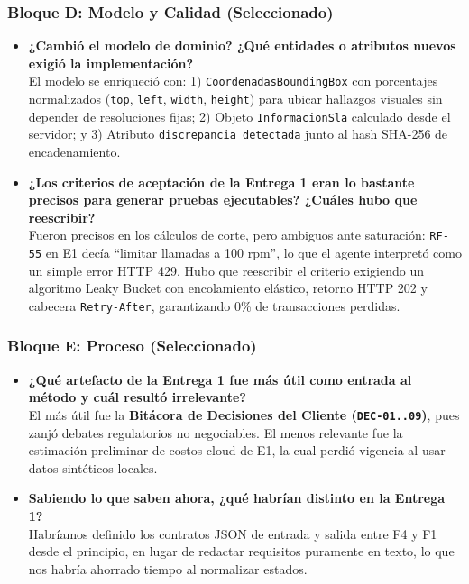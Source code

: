 \documentclass[11pt,letterpaper]{article}
\begin{document}
\subsubsection{Bloque D: Modelo y Calidad (Seleccionado)}
\begin{itemize}
    \item \textbf{¿Cambió el modelo de dominio? ¿Qué entidades o atributos nuevos exigió la implementación?}\\
    El modelo se enriqueció con: 1) \texttt{CoordenadasBoundingBox} con porcentajes normalizados (\texttt{top}, \texttt{left}, \texttt{width}, \texttt{height}) para ubicar hallazgos visuales sin depender de resoluciones fijas; 2) Objeto \texttt{InformacionSla} calculado desde el servidor; y 3) Atributo \texttt{discrepancia\_detectada} junto al hash SHA-256 de encadenamiento.
    \item \textbf{¿Los criterios de aceptación de la Entrega 1 eran lo bastante precisos para generar pruebas ejecutables? ¿Cuáles hubo que reescribir?}\\
    Fueron precisos en los cálculos de corte, pero ambiguos ante saturación: \texttt{RF-55} en E1 decía ``limitar llamadas a 100 rpm'', lo que el agente interpretó como un simple error HTTP 429. Hubo que reescribir el criterio exigiendo un algoritmo Leaky Bucket con encolamiento elástico, retorno HTTP 202 y cabecera \texttt{Retry-After}, garantizando 0\% de transacciones perdidas.
\end{itemize}

\subsubsection{Bloque E: Proceso (Seleccionado)}
\begin{itemize}
    \item \textbf{¿Qué artefacto de la Entrega 1 fue más útil como entrada al método y cuál resultó irrelevante?}\\
    El más útil fue la \textbf{Bitácora de Decisiones del Cliente (\texttt{DEC-01..09})}, pues zanjó debates regulatorios no negociables. El menos relevante fue la estimación preliminar de costos cloud de E1, la cual perdió vigencia al usar datos sintéticos locales.
    \item \textbf{Sabiendo lo que saben ahora, ¿qué habrían distinto en la Entrega 1?}\\
    Habríamos definido los contratos JSON de entrada y salida entre F4 y F1 desde el principio, en lugar de redactar requisitos puramente en texto, lo que nos habría ahorrado tiempo al normalizar estados.
\end{itemize}
\end{document}
